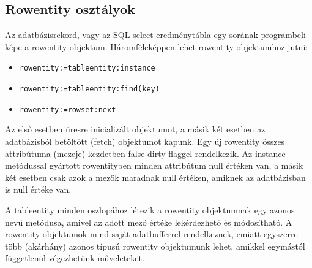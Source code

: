 \subsection{Rowentity osztályok}

Az adatbázisrekord, vagy az SQL select eredménytábla egy sorának 
programbeli képe a rowentity objektum. Háromféleképpen lehet rowentity
objektumhoz jutni:
\begin{itemize}
    \item \verb!rowentity:=tableentity:instance!
    \item \verb!rowentity:=tableentity:find(key)!
    \item \verb!rowentity:=rowset:next!
\end{itemize}
Az első esetben üresre inicializált objektumot,
a másik két esetben az adatbázisból betöltött (fetch) objektumot kapunk.
Egy új rowentity összes attribútuma (mezeje) kezdetben false dirty flaggel
rendelkezik. Az instance metódussal gyártott rowentityben minden 
attribútum null értéken van, a másik két esetben csak azok a mezők
maradnak null értéken, amiknek az adatbázisban is null értéke van.

A tableentity minden oszlopához létezik a rowentity objektumnak
egy azonos nevű metódusa, amivel az adott mező értéke lekérdezhető
és módosítható. A rowentity objektumok mind saját adatbufferrel
rendelkeznek, emiatt egyszerre több (akárhány) azonos típusú
rowentity objektumunk lehet, amikkel egymástól függetlenül
végezhetünk műveleteket.

